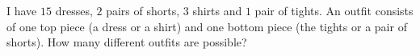 I have $15$ dresses, $2$ pairs of shorts, $3$ shirts and $1$ pair of tights. An outfit consists of one top piece (a dress or a shirt) and one bottom piece (the tights or a pair of shorts). How many different outfits are possible?
